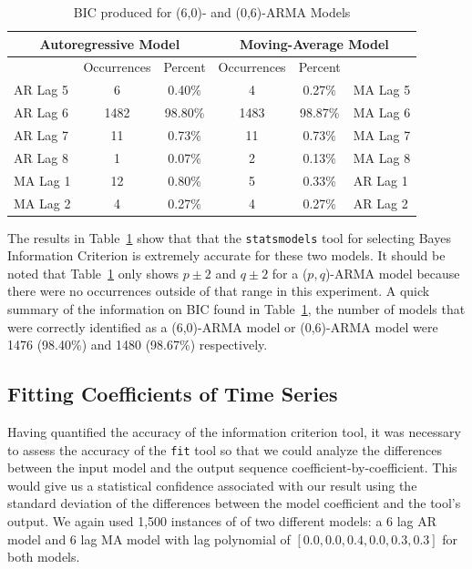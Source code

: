 \documentclass[oneside,12pt,openany]{book}
\begin{document}
    \begin{table}[!ht]
        \centering
        \begin{tabular}{|l|c|c|c|c|l|}
            \hline
            \multicolumn{3}{|c|}{Autoregressive Model} & \multicolumn{3}{c|}{Moving-Average Model} \\ \hline
            \cellcolor{black} & Occurrences & Percent & Occurrences & Percent & \cellcolor{black} \\ \hline
            AR Lag 5 & 6 & 0.40\% & 4 & 0.27\% & MA Lag 5 \\ \hline
            AR Lag 6 & 1482 & 98.80\% & 1483 & 98.87\% & MA Lag 6 \\ \hline
            AR Lag 7 & 11 & 0.73\% & 11 & 0.73\% & MA Lag 7 \\ \hline
            AR Lag 8 & 1 & 0.07\% & 2 & 0.13\% & MA Lag 8 \\ \hline
            MA Lag 1 & 12 & 0.80\% & 5 & 0.33\% & AR Lag 1 \\ \hline
            MA Lag 2 & 4 & 0.27\% & 4 & 0.27\% & AR Lag 2 \\ \hline
        \end{tabular}
        \caption{BIC produced for (6,0)- and (0,6)-ARMA Models}
        \label{tab:bic6}
    \end{table}
    
    
    The results in Table~\ref{tab:bic6} show that that the \texttt{statsmodels} tool for selecting Bayes Information Criterion is extremely accurate for these two models. It should be noted that Table~\ref{tab:bic6} only shows $p\pm2$ and $q\pm2$ for a ($p,q$)-ARMA model because there were no occurrences outside of that range in this experiment. A quick summary of the information on BIC found in Table~\ref{tab:bic6}, the number of models that were correctly identified as a (6,0)-ARMA model or (0,6)-ARMA model were 1476 (98.40\%) and 1480 (98.67\%) respectively.
    
    \subsection{Fitting Coefficients of Time Series}
    
    Having quantified the accuracy of the information criterion tool, it was necessary to assess the accuracy of the \texttt{fit} tool so that we could analyze the differences between the input model and the output sequence coefficient-by-coefficient. This would give us a statistical confidence associated with our result using the standard deviation of the differences between the model coefficient and the tool's output. We again used 1,500 instances of of two different models: a 6 lag AR model and 6 lag MA model with lag polynomial of $[0.0,0.0,0.4,0.0,0.3,0.3]$ for both models.
    
\end{document}
